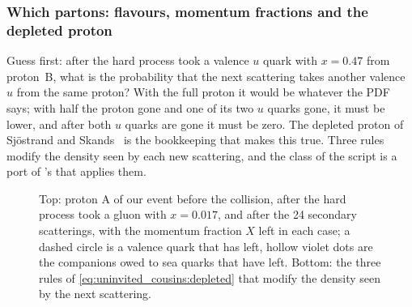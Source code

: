\subsubsection{Which partons: flavours, momentum fractions and the depleted proton}
\label{sec:uninvited_cousins:flavours}

Guess first: after the hard process took a valence $u$ quark with $x=0.47$
from proton~B, what is the probability that the next scattering takes
another valence $u$ from the same proton? With the full proton it would be
whatever the PDF says; with half the proton gone and one of its two $u$
quarks gone, it must be lower, and after both $u$ quarks are gone it must
be zero. The depleted proton of Sj\"ostrand and Skands~\cite{Sjostrand:2004pf}
is the bookkeeping that makes this true. Three rules modify the density
seen by each new scattering, and the  class of the script is a
port of \PYTHIA's  that applies them.

\begin{figure}[htbp]\centering
\resizebox{\textwidth}{!}{}
\caption[The protons are used up]{Top: proton A of our event before the
collision, after the hard process took a gluon with $x=0.017$, and after the
24 secondary scatterings, with the momentum fraction $X$ left in each case;
a dashed circle is a valence quark that has left, hollow violet dots are the
companions owed to sea quarks that have left. Bottom: the three rules of
\cref{eq:uninvited_cousins:depleted} that modify the density seen by the
next scattering.}
\label{fig:uninvited_cousins:depletion_sketch}
\end{figure}

